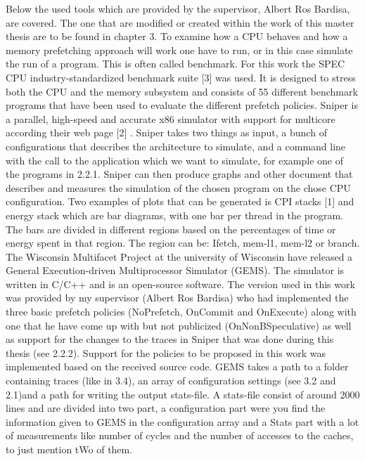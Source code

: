 Below the used tools which are provided by the supervisor, Albert Ros Bardisa, are
covered. The one that are modified or created within the work of this master thesis
are to be found in chapter 3.\fixme
{}
To examine how a CPU behaves and how a memory prefetching approach will work
one have to run, or in this case simulate the run of a program. This is often called
benchmark. For this work the SPEC CPU  industry-standardized benchmark
suite [3] \fixme was used. It is designed to stress both the CPU and the memory subsystem
and consists of 55 different benchmark programs that have been used to evaluate the
different prefetch policies.
Sniper is a parallel, high-speed and accurate x86 simulator with support for multicore
according their web page [2] \fixme. Sniper takes two things as input, a bunch of configurations
that describes the architecture to simulate, and a command line with the call to
the application which we want to simulate, for example one of the programs in 2.2.1.
Sniper can then produce graphs and other document that describes and measures the
simulation of the chosen program on the chose CPU configuration. Two examples of
plots that can be generated is CPI stacks [1] and energy stack which are bar diagrams,
with one bar per thread in the program. The bars are divided in different regions
based on the percentages of time or energy spent in that region. The region can be:
Ifetch, mem-l1, mem-l2 or branch.
The Wisconsin Multifacet Project at the university of Wisconsin have released a General
Execution-driven Multiprocessor Simulator (GEMS). The simulator is written in
C/C++ and is an open-source software. The version used in this work was provided
by my supervisor (Albert Ros Bardisa) who had implemented the three basic prefetch
policies (NoPrefetch, OnCommit and OnExecute) along with one that he have come
up with but not publicized (OnNonBSpeculative) as well as support for the changes
to the traces in Sniper that was done during this thesis (see 2.2.2)\fixme. Support for the
policies to be proposed in this work was implemented based on the received source
code.
GEMS takes a path to a folder containing traces (like in 3.4)\fixme, an array of configuration
settings (see 3.2 and 2.1)\fixme and a path for writing the output stats-file. A
stats-file consist of around 2000 lines and are divided into two part, a configuration
part were you find the information given to GEMS in the configuration array and
a Stats part with a lot of measurements like number of cycles and the number of
accesses to the caches, to just mention tWo of them.
